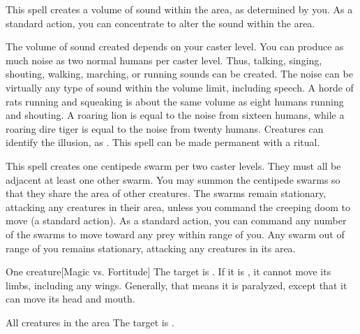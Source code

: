\spelldur{\durshort \dismissable}
\spellline
\spelleffect This spell creates a volume of sound within the area, as determined by you. As a standard action, you can concentrate to alter the sound within the area.
\par The volume of sound created depends on your caster level. You can produce as much noise as two normal humans per caster level. Thus, talking, singing, shouting, walking, marching, or running sounds can be created. The noise can be virtually any type of sound within the volume limit, including speech. A horde of rats running and squeaking is about the same volume as eight humans running and shouting. A roaring lion is equal to the noise from sixteen humans, while a roaring dire tiger is equal to the noise from twenty humans.
\spellnotes Creatures can identify the illusion, as . This spell can be made permanent with a  ritual.

\spellrng{\rngmed}
\spelldur{\durmed}
\spellline
\spelleffect This spell creates one centipede swarm per two caster levels. They must all be adjacent at least one other swarm. You may summon the centipede swarms so that they share the area of other creatures. The swarms remain stationary, attacking any creatures in their area, unless you command the creeping doom to move (a standard action). As a standard action, you can command any number of the swarms to move toward any prey within range of you. Any swarm out of range of you remains stationary, attacking any creatures in its area.

\spellrng{\rngmed}
\spelldur{\durshort}
\begin{spelltarget}{One creature}[Magic vs. Fortitude]
    \spellsuccess The target is \staggered. If it is \bloodied, it cannot move its limbs, including any wings. Generally, that means it is paralyzed, except that it can move its head and mouth.
\end{spelltarget}

\spelldur{\durmed}
\begin{spelltargets}{All creatures in the area}
    The target is \vulnerable.
\end{spelltargets}

